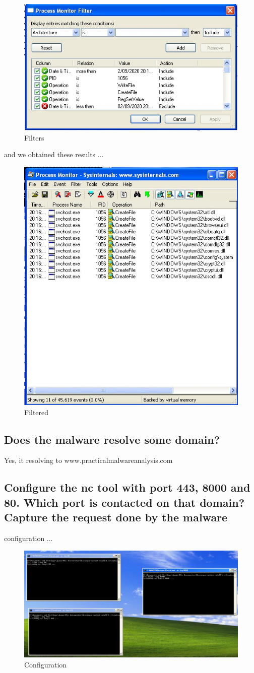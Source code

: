 \documentclass[12pt,letter]{article} %
\begin{document}
        \begin{figure}[h!]
            \centering
            \includegraphics[width=0.4\linewidth]{filters.jpeg}
            \caption{Filters}
            \label{fig:filters}
        \end{figure}
        and we obtained these results ...
        \begin{figure}[h!]
            \centering
            \includegraphics[width=0.5\linewidth]{filtered.jpeg}
            \caption{Filtered}
            \label{fig:filtered}
        \end{figure}

        \subsection{Does the malware resolve some domain? }
            Yes, it resolving to www.practicalmalwareanalysis.com

        \subsection{Configure the nc tool with port 443, 8000 and 80. Which
        port is contacted on that domain? Capture the request done by the
        malware}
            configuration ...
            \begin{figure}[h!]
                \centering
                \includegraphics[width=0.6\linewidth]{tres.jpeg}
                \caption{Configuration}
                \label{configuration}
            \end{figure}
\end{document}
